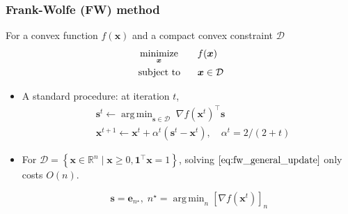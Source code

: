 \documentclass[10pt,xcolor={usenames,dvipsnames,table}]{beamer}
\def\blue{\color{blue}}
\newcommand{\set}[1]{\left\{#1\right\}}
\newcommand{\T}{\!\top\!}
\DeclareMathOperator*{\argmin}{arg\,min}
\DeclareMathOperator*{\minimize}{minimize}
\newcommand{\citep}[1]{{\blue \scriptsize \parencite{#1}}}
\begin{document}
\begin{frame}
    \frametitle{Frank-Wolfe (FW) method \citep{jaggi2013revisiting}}
    For a convex function $f(\bm{x})$ and a compact convex constraint  $\mathcal{D}$ 
    \begin{alignat*}{2}
        & \minimize_{\bm{x}} \quad && f(\bm{x}) \\
        & \text{\rm subject to} && \bm{x} \in \mathcal{D}
    \end{alignat*}
    \begin{itemize}
        \item A standard procedure: at iteration $t$,
        \begin{align}
        &\bm{s}^{t} \leftarrow \argmin_{\bm{s} \in \mathcal{D}} \; \nabla f(\bm{x}^{t})^{\T} \bm{s} \label{eq:fw_general_update}\\
        &\bm{x}^{t+1} \leftarrow \bm{x}^{t} + \alpha^{t} (\bm{s}^{t} - \bm{x}^{t}) , \quad \alpha^{t}=2/(2+t) \nonumber
        \end{align}

        \item For $\mathcal{D} = \set{\bm{x} \in \mathbb{R}^{n} \mid \bm{x} \geq 0, \bm{1}^{\T}\bm{x} = 1}$, solving $\eqref{eq:fw_general_update}$ only costs $O(n)$.

    \[
    \bm{s} = \bm{e}_{n^{\star}}, \; n^{\star} = \argmin_{n} [\nabla f(\bm{x}^{t})]_n
    \] 
    \end{itemize}
    
\end{frame}
\end{document}
